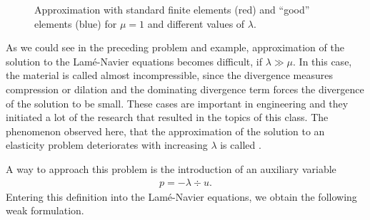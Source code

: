 \begin{figure}[tp]
  \caption{Approximation with standard finite elements (red) and
    ``good'' elements (blue) for $\mu=1$ and different values of
    $\lambda$.}
  \label{fig:elasticity-compressibility}
\end{figure}

\begin{intro}
  As we could see in the preceding problem and example, approximation
  of the solution to the Lamé-Navier equations becomes difficult, if
  $\lambda \gg \mu$. In this case, the material is called almost
  incompressible, since the divergence measures compression or
  dilation and the dominating divergence term forces the divergence of
  the solution to be small. These cases are important in engineering
  and they initiated a lot of the research that resulted in the topics
  of this class. The phenomenon observed here, that the approximation
  of the solution to an elasticity problem deteriorates with
  increasing $\lambda$ is called .
\end{intro}



\begin{intro}
  A way to approach this problem is the introduction of an auxiliary variable
  \begin{gather*}
    p = -\lambda \div u.
  \end{gather*}
  Entering this definition into the Lamé-Navier equations, we obtain
  the following weak formulation.
\end{intro}

